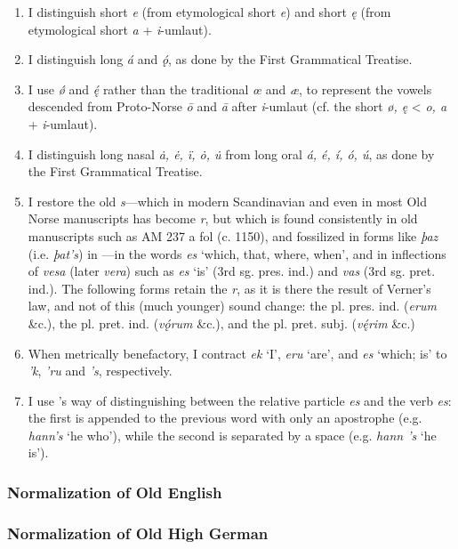     \begin{enumerate}
    \item I distinguish short \emph{e} (from etymological short \emph{e}) and short \emph{ę} (from etymological short \emph{a} + \emph{i}-umlaut).
    \item I distinguish long \emph{á} and \emph{ǫ́}, as done by the First Grammatical Treatise.
    \item I use \emph{ǿ} and \emph{ę́} rather than the traditional \emph{œ} and \emph{æ}, to represent the vowels descended from Proto-Norse \emph{ō} and \emph{ā} after \emph{i}-umlaut (cf. the short \emph{ø, ę} < \emph{o, a} + \emph{i}-umlaut).
    \item I distinguish long nasal \emph{ȧ, ė, ï, ȯ, u̇} from long oral \emph{á, é, í, ó, ú}, as done by the First Grammatical Treatise.
    \item I restore the old \emph{s}—which in modern Scandinavian and even in most Old Norse manuscripts has become \emph{r}, but which is found consistently in old manuscripts such as AM 237 a fol (c. 1150), and fossilized in forms like \emph{þaz} (i.e. \emph{þat’s}) in \Regius—in the words \emph{es} ‘which, that, where, when’, and in inflections of \emph{vesa} (later \emph{vera}) such as \emph{es} ‘is’ (3rd sg. pres. ind.) and \emph{vas} (3rd sg. pret. ind.). The following forms retain the \emph{r}, as it is there the result of Verner’s law, and not of this (much younger) sound change: the pl. pres. ind. (\emph{erum} \&c.), the pl. pret. ind. (\emph{vǫ́rum} \&c.), and the pl. pret. subj. (\emph{vę́rim} \&c.)
    \item When metrically benefactory, I contract \emph{ek} ‘I’, \emph{eru} ‘are’, and \emph{es} ‘which; is’ to \emph{’k}, \emph{’ru} and \emph{’s}, respectively.
    \item I use \textcite{FinnurEdda}’s way of distinguishing between the relative particle \emph{es} and the verb \emph{es}: the first is appended to the previous word with only an apostrophe (e.g. \emph{hann’s} ‘he who’), while the second is separated by a space (e.g. \emph{hann ’s} ‘he is’).
    \end{enumerate}

    \subsubsection{Normalization of Old English}

    \subsubsection{Normalization of Old High German}

